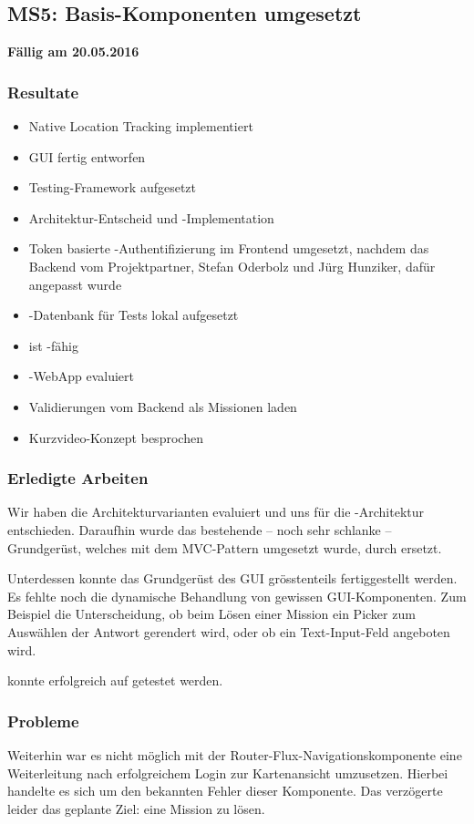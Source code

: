 \subsection{MS5: Basis-Komponenten umgesetzt}
\label{pm-ms5}
\textbf{Fällig am 20.05.2016}
\subsubsection{Resultate}
\begin{itemize}
	\item Native Location Tracking implementiert
	\item \gls{GUI} fertig entworfen
	\item Testing-\gls{Framework} aufgesetzt
	\item Architektur-Entscheid und -Implementation
	\item Token basierte -Authentifizierung im Frontend umgesetzt, nachdem das Backend vom Projektpartner, Stefan Oderbolz und Jürg Hunziker, dafür angepasst wurde
	\item \kort{}-Datenbank für Tests lokal aufgesetzt
	\item \kort{} ist -fähig
	\item {}-\gls{WebApp} evaluiert
	\item Validierungen vom Backend als Missionen laden
	\item Kurzvideo-Konzept besprochen
\end{itemize}

\subsubsection{Erledigte Arbeiten}

Wir haben die Architekturvarianten evaluiert und uns für die -Architektur entschieden.
Daraufhin wurde das bestehende -- noch sehr schlanke -- Grundgerüst, welches mit dem MVC-Pattern umgesetzt wurde, durch  ersetzt.

Unterdessen konnte das Grundgerüst des \gls{GUI} grösstenteils fertiggestellt werden. 
Es fehlte noch die dynamische Behandlung von gewissen GUI-Komponenten.
Zum Beispiel die Unterscheidung, ob beim Lösen einer Mission ein Picker zum Auswählen der Antwort gerendert wird, oder ob ein Text-Input-Feld angeboten wird.

\kort{} konnte erfolgreich auf  getestet werden. 

\subsubsection{Probleme}
Weiterhin war es nicht möglich mit der Router-Flux-Navigationskomponente eine Weiterleitung nach erfolgreichem Login zur Kartenansicht umzusetzen.
Hierbei handelte es sich um den bekannten Fehler dieser Komponente.
Das verzögerte leider das geplante Ziel: eine Mission zu lösen.

